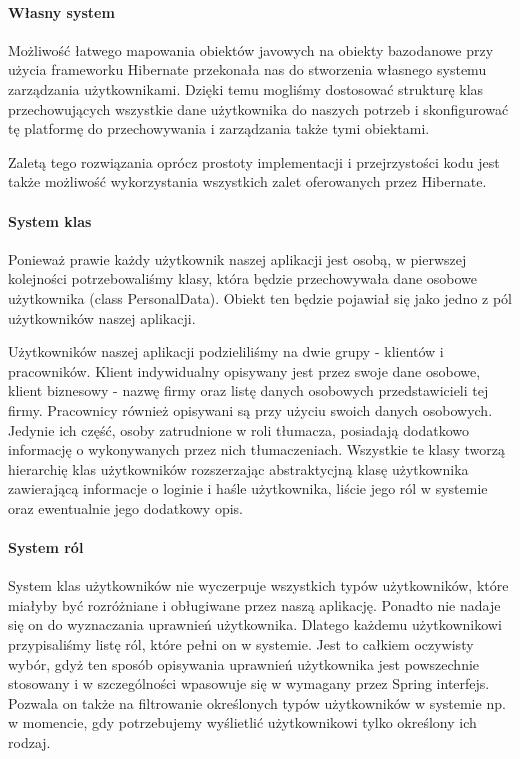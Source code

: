 \documentclass[licencjacka]{pracamgr}
\begin{document}
\paragraph{Własny system}
Możliwość łatwego mapowania obiektów javowych na obiekty bazodanowe przy użycia frameworku Hibernate przekonała nas do stworzenia własnego systemu zarządzania użytkownikami. Dzięki temu mogliśmy dostosować strukturę klas przechowujących wszystkie dane użytkownika do naszych potrzeb i skonfigurować tę platformę do przechowywania i zarządzania także tymi obiektami.

Zaletą tego rozwiązania oprócz prostoty implementacji i przejrzystości kodu jest także możliwość wykorzystania wszystkich zalet oferowanych przez Hibernate.

\paragraph{System klas}
Ponieważ prawie każdy użytkownik naszej aplikacji jest osobą, w pierwszej kolejności potrzebowaliśmy klasy, która będzie przechowywała dane osobowe użytkownika (class PersonalData). Obiekt ten będzie pojawiał się jako jedno z pól użytkowników naszej aplikacji.

Użytkowników naszej aplikacji podzieliliśmy na dwie grupy - klientów i pracowników. Klient indywidualny opisywany jest przez swoje dane osobowe, klient biznesowy - nazwę firmy oraz listę danych osobowych przedstawicieli tej firmy. Pracownicy również opisywani są przy użyciu swoich danych osobowych. Jedynie ich część, osoby zatrudnione w roli tłumacza, posiadają dodatkowo informację o wykonywanych przez nich tłumaczeniach.
Wszystkie te klasy tworzą hierarchię klas użytkowników rozszerzając abstraktycjną klasę użytkownika zawierającą informacje o loginie i haśle użytkownika, liście jego ról w systemie oraz ewentualnie jego dodatkowy opis.

\paragraph{System ról}
System klas użytkowników nie wyczerpuje wszystkich typów użytkowników, które miałyby być rozróżniane i obługiwane przez naszą aplikację. Ponadto nie nadaje się on do wyznaczania uprawnień użytkownika. Dlatego każdemu użytkownikowi przypisaliśmy listę ról, które pełni on w systemie. Jest to całkiem oczywisty wybór, gdyż ten sposób opisywania uprawnień użytkownika jest powszechnie stosowany i w szczególności wpasowuje się w wymagany przez Spring interfejs. Pozwala on także na filtrowanie określonych typów użytkowników w systemie np. w momencie, gdy potrzebujemy wyślietlić użytkownikowi tylko określony ich rodzaj.
\end{document}
